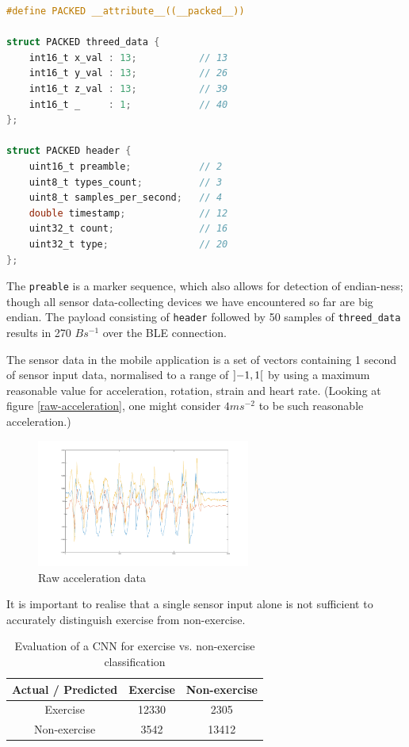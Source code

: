 \documentclass[a4paper, 10 pt, conference]{IEEEtran}
\begin{document}
\begin{lstlisting}[language=C,caption={BLE 3-axis data},label={lst:threed-data}]
#define PACKED __attribute__((__packed__))

struct PACKED threed_data {
    int16_t x_val : 13;           // 13
    int16_t y_val : 13;           // 26
    int16_t z_val : 13;           // 39
    int16_t _     : 1;            // 40
};

struct PACKED header {
    uint16_t preamble;            // 2
    uint8_t types_count;          // 3
    uint8_t samples_per_second;   // 4
    double timestamp;             // 12
    uint32_t count;               // 16
    uint32_t type;                // 20
};
\end{lstlisting}

The \texttt{preable} is a marker sequence, which also allows for detection of endian-ness; though all sensor data-collecting devices we have encountered so far are big endian. The payload consisting of \texttt{header} followed by 50 samples of \texttt{threed\_data} results in 270 $Bs^{-1}$ over the BLE connection. 

The sensor data in the mobile application is a set of vectors containing 1 second of sensor input data, normalised to a range of $\interval[open]{-1}{1}$ by using a maximum reasonable value for acceleration, rotation, strain and heart rate. (Looking at figure \autoref{raw-acceleration}, one might consider $4ms^{-2}$ to be such reasonable acceleration.) 

\begin{figure}[hp]
	\begin{center}
		\caption{Raw acceleration data}
		\label{raw-acceleration}
		\includegraphics[width=7cm,keepaspectratio]{ri-raw-acceleration.png}
	\end{center}
\end{figure}


It is important to realise that a single sensor input alone is not sufficient to accurately distinguish exercise from non-exercise. 

\begin{table}[h]
\caption{Evaluation of a CNN for exercise vs. non-exercise classification}
\label{exercise}
\begin{center}
\begin{tabular}{|c||c||c|}
\hline
Actual / Predicted & Exercise & Non-exercise\\
\hline
Exercise & 12330 & 2305\\
\hline
Non-exercise & 3542 & 13412\\
\hline
\end{tabular}
\end{center}
\end{table}
\end{document}
